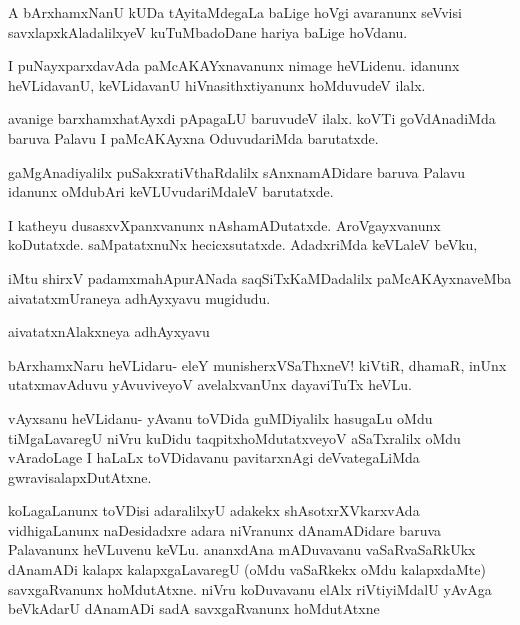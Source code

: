 \documentclass{article}
\begin{document}
\begin{mng}%
A bArxhamxNanU kUDa tAyitaMdegaLa baLige hoVgi avaranunx
seVvisi savxlapxkAladalilxyeV kuTuMbadoDane hariya baLige hoVdanu.
\end{mng}

\begin{mng}%
I puNayxparxdavAda paMcAKAYxnavanunx nimage heVLidenu.
idanunx heVLidavanU, keVLidavanU hiVnasithxtiyanunx hoMduvudeV ilalx.
\end{mng}

\begin{mng}%
avanige barxhamxhatAyxdi pApagaLU baruvudeV ilalx. koVTi
goVdAnadiMda baruva Palavu I paMcAKAyxna OduvudariMda barutatxde.
\end{mng}

\begin{mng}%
gaMgAnadiyalilx puSakxratiVthaRdalilx sAnxnamADidare baruva Palavu
idanunx oMdubAri keVLUvudariMdaleV barutatxde.
\end{mng}

\begin{mng}%
I katheyu dusasxvXpanxvanunx nAshamADutatxde. AroVgayxvanunx
koDutatxde. saMpatatxnuNx hecicxsutatxde. AdadxriMda keVLaleV beVku,
\end{mng}

\begin{center}
iMtu shirxV padamxmahApurANada saqSiTxKaMDadalilx paMcAKAyxnaveMba
aivatatxmUraneya adhAyxyavu mugidudu.
\end{center}

\newpage
\begin{center}
{\textbf\large{aivatatxnAlakxneya adhAyxyavu}}
\end{center}

\begin{mng}%
bArxhamxNaru heVLidaru- eleY munisherxVSaThxneV! kiVtiR, dhamaR,
inUnx utatxmavAduvu yAvuviveyoV avelalxvanUnx dayaviTuTx heVLu.
\end{mng}

\begin{mng}%
vAyxsanu heVLidanu- yAvanu toVDida guMDiyalilx hasugaLu
oMdu tiMgaLavaregU niVru kuDidu taqpitxhoMdutatxveyoV aSaTxralilx oMdu
vAradoLage I haLaLx toVDidavanu pavitarxnAgi deVvategaLiMda gwravisalapxDutAtxne.
\end{mng}

\begin{mng}%
koLagaLanunx toVDisi adaralilxyU adakekx shAsotxrXVkarxvAda
vidhigaLanunx naDesidadxre adara niVranunx dAnamADidare baruva Palavanunx heVLuvenu
keVLu. ananxdAna mADuvavanu vaSaRvaSaRkUkx dAnamADi kalapx kalapxgaLavaregU
(oMdu vaSaRkekx oMdu kalapxdaMte) savxgaRvanunx hoMdutAtxne.
niVru koDuvavanu elAlx riVtiyiMdalU yAvAga beVkAdarU dAnamADi
sadA savxgaRvanunx hoMdutAtxne
\end{mng}
\end{document}

